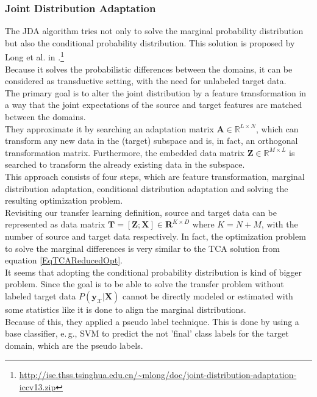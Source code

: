 \subsubsection{Joint Distribution Adaptation}
The \acl{JDA} algorithm tries not only to solve the marginal probability distribution but also the conditional probability distribution.
This solution is proposed by Long et al. in \cite{Long.}.\footnote{\url{http://ise.thss.tsinghua.edu.cn/~mlong/doc/joint-distribution-adaptation-iccv13.zip}}\\
Because it solves the probabilistic differences between the domains, it can be considered as transductive setting, with the need for unlabeled target data.\\
The primary goal is to alter the joint distribution by a feature transformation in a way that the joint expectations of the source and target features are matched between the domains.\cite{Long.}\\
They approximate it by searching an adaptation matrix $\mathbf{A} \in \mathbb{R}^{L \times N }$, which can transform any new data in the (target) subspace and is, in fact, an orthogonal transformation matrix.
Furthermore, the embedded data matrix $\mathbf{Z} \in \mathbb{R}^{M\times L}$ is searched to transform the already existing data in the subspace.\cite{Long.}\\
This approach consists of four steps, which are feature transformation, marginal distribution adaptation, conditional distribution adaptation and solving the resulting optimization problem.\cite{Long.}\\
Revisiting our transfer learning definition, source and target data can be represented as data matrix $\mathbf{T} = [\mathbf{Z};\mathbf{X}] \in \mathbf{R}^{K\times D}$ where $K = N+M$, with the number of source and target data respectively.
In fact, the optimization problem to solve the marginal differences is very similar to the \acs{TCA} solution from equation \eqref{EqTCAReducedOpt}.\cite{Pan.2011}\\
It seems that adopting the conditional probability distribution is kind of bigger problem.
Since the goal is to be able to solve the transfer problem without labeled target data $P(\mathbf{y}_\mathcal{X}\vert \mathbf{X})$ cannot be directly modeled or estimated with some statistics like it is done to align the marginal distributions.\cite{Long.}\\
Because of this, they applied a pseudo label technique.
This is done by using a base classifier, e.\,g., \acs{SVM} to predict the not 'final' class labels for the target domain, which are the pseudo labels.
